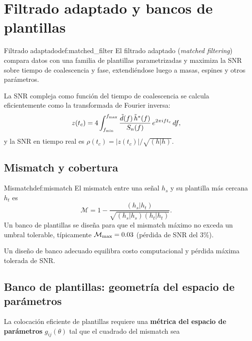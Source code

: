 \section{Filtrado adaptado y bancos de plantillas}
\label{sec:matched_filtering}

\begin{definicion}{Filtrado adaptado}{def:matched_filter}
El filtrado adaptado (\emph{matched filtering}) compara datos con una familia de plantillas parametrizadas y maximiza la SNR sobre tiempo de coalescencia y fase, extendiéndose luego a masas, espines y otros parámetros.
\end{definicion}

La SNR compleja como función del tiempo de coalescencia se calcula eficientemente como la transformada de Fourier inversa:
\begin{equation}
  z(t_c) = 4\int_{f_{\rm min}}^{f_{\rm max}}
  \frac{\tilde{d}(f)\,\tilde{h}^*(f)}{S_n(f)}\,e^{2\pi i f t_c}\,df,
  \label{eq:snr_timeseries}
\end{equation}
y la SNR en tiempo real es $\rho(t_c) = |z(t_c)|/\sqrt{(h|h)}$.

\subsection{Mismatch y cobertura}

\begin{definicion}{Mismatch}{def:mismatch}
El mismatch entre una señal $h_s$ y su plantilla más cercana $h_t$ es
\begin{equation}
  \mathcal{M} = 1 - \frac{(h_s|h_t)}{\sqrt{(h_s|h_s)(h_t|h_t)}}.
\end{equation}
Un banco de plantillas se diseña para que el mismatch máximo no exceda un umbral tolerable, típicamente $\mathcal{M}_{\rm max} = 0.03$ (pérdida de SNR del $3\%$).
\end{definicion}

Un diseño de banco adecuado equilibra costo computacional y pérdida máxima tolerada de SNR.

\subsection{Banco de plantillas: geometría del espacio de parámetros}

La colocación eficiente de plantillas requiere una \textbf{métrica del espacio de parámetros} $g_{ij}(\theta)$ tal que el cuadrado del mismatch sea

